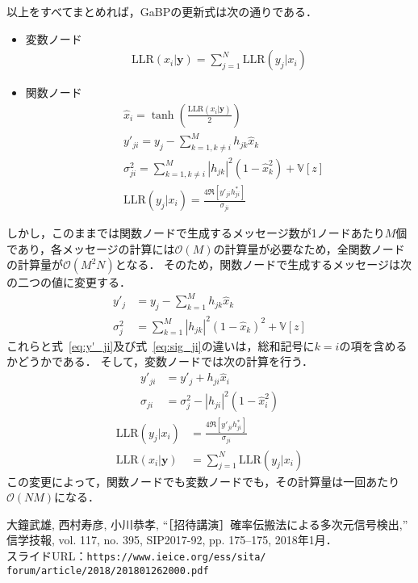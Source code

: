 \documentclass[twocolumn, a4paper]{ieicejsp}
\newcommand{\ABS}[1]{\left|#1\right|}
\newcommand{\BRKTS}[1]{\left[#1\right]}
\begin{document}
以上をすべてまとめれば，GaBPの更新式は次の通りである．
\begin{itemize}
  \item 変数ノード
  \begin{align}
    \mathrm{LLR}(x_i | \mathbf{y}) = \sum_{j=1}^N \mathrm{LLR}(y_j | x_i)
  \end{align}
  \item 関数ノード
  \begin{align}
    &\hat{x}_i = \tanh\left(\frac{\mathrm{LLR}(x_i|\mathbf{y})}{2}\right)\\
    &y'_{ji} = y_j - \sum_{k=1, k\not=i}^{M} h_{jk} \hat{x}_k \label{eq:y'_ji} \\
    &\sigma^2_{ji} = \sum_{k=1,k\not=i}^{M} |h_{jk}|^2 (1- \hat{x}_k^2) + \mathbb{V}[z] \label{eq:sig_ji} \\
    &\mathrm{LLR}(y_j | x_i) = \frac{4\Re\BRKTS{y'_{ji} h_{ji}^{*} }}{\sigma_{ji}}
  \end{align}
\end{itemize}
しかし，このままでは関数ノードで生成するメッセージ数が1ノードあたり$M$個であり，各メッセージの計算には$\mathcal{O}(M)$の計算量が必要なため，全関数ノードの計算量が$\mathcal{O}(M^2 N)$となる．
そのため，関数ノードで生成するメッセージは次の二つの値に変更する．
\begin{align}
  y'_{j} &= y_j - \sum_{k=1}^{M} h_{jk} \hat{x}_k \\
  \sigma_{j}^{2} &= \sum_{k=1}^{M} \ABS{h_{jk}}^2 (1 - \hat{x}_k)^2 + \mathbb{V}[z]
\end{align}
これらと式~\eqref{eq:y'_ji}及び式~\eqref{eq:sig_ji}の違いは，総和記号に$k=i$の項を含めるかどうかである．
そして，変数ノードでは次の計算を行う．
\begin{align}
  y'_{ji} &= y'_j + h_{ji} \hat{x}_i \\
  \sigma_{ji} &= \sigma_{j}^2 - \ABS{h_{ji}}^2 (1 - \hat{x}_i^2)
\end{align}
\begin{align}
  \mathrm{LLR}(y_j | x_i) &= \frac{4\Re\BRKTS{y'_{ji} h_{ji}^{*} }}{\sigma_{ji}} \\
  \mathrm{LLR}(x_i | \mathbf{y}) &= \sum_{j=1}^N \mathrm{LLR}(y_j | x_i)
\end{align}
この変更によって，関数ノードでも変数ノードでも，その計算量は一回あたり$\mathcal{O}(NM)$になる．



\begin{thebibliography}{99}
 大鐘武雄, 西村寿彦, 小川恭孝, ``［招待講演］確率伝搬法による多次元信号検出,'' 信学技報, vol. 117, no. 395, SIP2017-92, pp. 175--175, 2018年1月． \\スライドURL：\verb|https://www.ieice.org/ess/sita/|
\verb|forum/article/2018/201801262000.pdf|

\end{thebibliography}
\end{document}
